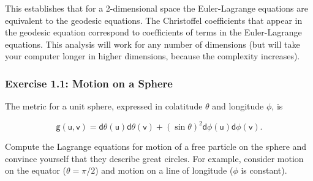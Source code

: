 \documentclass[11pt]{article}
\begin{document}
This establishes that for a 2-dimensional space the Euler-Lagrange equations
are equivalent to the geodesic equations. The Christoffel coefficients that
appear in the geodesic equation correspond to coefficients of terms in the
Euler-Lagrange equations. This analysis will work for any number of
dimensions (but will take your computer longer in higher dimensions, because
the complexity increases).

\subsubsection{Exercise 1.1: Motion on a Sphere}
\label{sec:org834fd90}

The metric for a unit sphere, expressed in colatitude \(\theta\) and longitude
\(\phi\), is

\begin{equation}
\mathsf{g}(\mathsf{u}, \mathsf{v})= \mathsf{d}\theta(\mathsf{u})\mathsf{d}\theta(\mathsf{v}) + (\sin \theta)^{2} \mathsf{d}\phi(\mathsf{u}) \mathsf{d} \phi(\mathsf{v}).
\end{equation}

Compute the Lagrange equations for motion of a free particle on the sphere
and convince yourself that they describe great circles. For example, consider
motion on the equator (\(\theta = \pi/2\)) and motion on a line of longitude
(\(\phi\) is constant).
\end{document}
